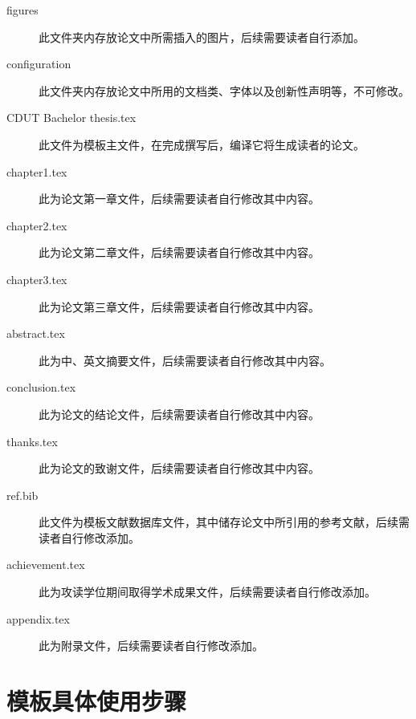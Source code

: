 \begin{description}
  \item[figures]  此文件夹内存放论文中所需插入的图片，后续需要读者自行添加。
  
  \item[configuration]  此文件夹内存放论文中所用的文档类、字体以及创新性声明等，不可修改。
  
  \item[CDUT Bachelor thesis.tex]  此文件为模板主文件，在完成撰写后，编译它将生成读者的论文。
  
  \item[chapter1.tex]  此为论文第一章文件，后续需要读者自行修改其中内容。
  
  \item[chapter2.tex]  此为论文第二章文件，后续需要读者自行修改其中内容。
  
  \item[chapter3.tex]  此为论文第三章文件，后续需要读者自行修改其中内容。
  
  \item[abstract.tex]  此为中、英文摘要文件，后续需要读者自行修改其中内容。
  
  \item[conclusion.tex]  此为论文的结论文件，后续需要读者自行修改其中内容。
  
  \item[thanks.tex]  此为论文的致谢文件，后续需要读者自行修改其中内容。
  
  \item[ref.bib]  此文件为模板文献数据库文件，其中储存论文中所引用的参考文献，后续需读者自行修改添加。

  \item[achievement.tex]  此为攻读学位期间取得学术成果文件，后续需要读者自行修改添加。

  \item[appendix.tex]  此为附录文件，后续需要读者自行修改添加。
\end{description}

\section{模板具体使用步骤}

